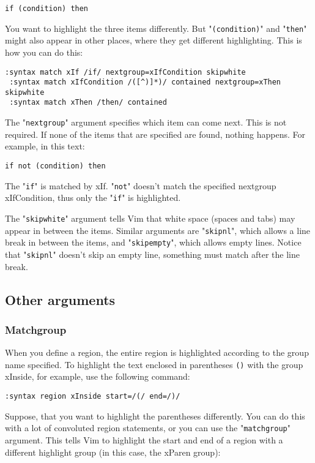\begin{Verbatim}[samepage=true]
    if (condition) then 
\end{Verbatim}

You want to highlight the three items differently.
But "\texttt{(condition)}" and "\texttt{then}" might also appear in other places, where they get different highlighting.
This is how you can do this:

\begin{Verbatim}[samepage=true]
 :syntax match xIf /if/ nextgroup=xIfCondition skipwhite
 :syntax match xIfCondition /([^)]*)/ contained nextgroup=xThen skipwhite
 :syntax match xThen /then/ contained
\end{Verbatim}

The "\texttt{nextgroup}" argument specifies which item can come next.
This is not required.
If none of the items that are specified are found, nothing happens.
For example, in this text:

\begin{Verbatim}[samepage=true]
    if not (condition) then 
\end{Verbatim}

The "\texttt{if}" is matched by xIf.
"\texttt{not}" doesn't match the specified nextgroup xIfCondition, thus only the "\texttt{if}" is highlighted.

The "\texttt{skipwhite}" argument tells Vim that white space (spaces and tabs) may appear in between the items.
Similar arguments are "\texttt{skipnl}", which allows a line break in between the items, and "\texttt{skipempty}", which allows empty lines.
Notice that "\texttt{skipnl}" doesn't skip an empty line, something must match after the line break.
\subsection{Other arguments}
\subsubsection{Matchgroup}
When you define a region, the entire region is highlighted according to the group name specified.
To highlight the text enclosed in parentheses \texttt{()} with the group xInside, for example, use the following command:

\begin{Verbatim}[samepage=true]
 :syntax region xInside start=/(/ end=/)/
\end{Verbatim}

Suppose, that you want to highlight the parentheses differently.
You can do this with a lot of convoluted region statements, or you can use the "\texttt{matchgroup}" argument.
This tells Vim to highlight the start and end of a region with a different highlight group (in this case, the xParen group):

